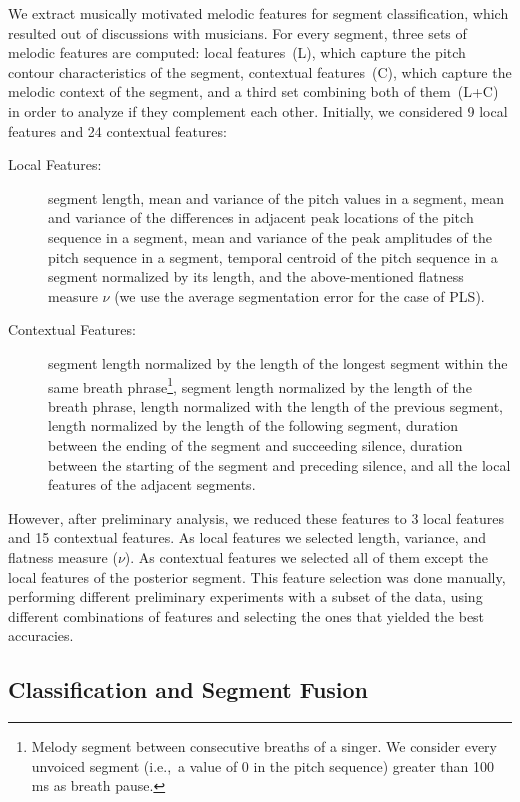 {{We extract musically motivated melodic features for segment classification, which resulted out of discussions with musicians. For every segment, three sets of melodic features are computed: local features~(L), which capture the pitch contour characteristics of the segment, contextual features~(C), which capture the melodic context of the segment, and a third set combining both of them~(L+C) in order to analyze if they complement each other. Initially, we considered 9 local features and 24 contextual features:

\begin{description}
	\item[Local Features:] segment length, mean and variance of the pitch values in a segment, mean and variance of the differences in adjacent peak locations of the pitch sequence in a segment, mean and variance of the  peak amplitudes of the pitch sequence in a segment, temporal centroid of the pitch sequence in a segment normalized by its length, and the above-mentioned flatness measure $\nu$ (we use the average segmentation error for the case of PLS).
	\item[Contextual Features:] segment length normalized by the length of the longest segment within the same breath phrase\footnote{Melody segment between consecutive breaths of a singer. We consider every unvoiced segment (i.e.,~a value of 0 in the pitch sequence) greater than 100\,ms as breath pause.}, segment length normalized by the length of the breath phrase, length normalized with the length of the previous segment, length normalized by the length of the following segment, duration between the ending of the segment and succeeding silence, duration between the starting of the segment and preceding silence, and all the local features of the adjacent segments.
\end{description}

However, after preliminary analysis, we reduced these features to 3 local features and 15 contextual features. As local features we selected length, variance, and flatness measure ($\nu$). As contextual features we selected all of them except the local features of the posterior segment. This feature selection was done manually, performing different preliminary experiments with a subset of the data, using different combinations of features and selecting the ones that yielded the best accuracies.

\subsection{Classification and Segment Fusion}

}}
